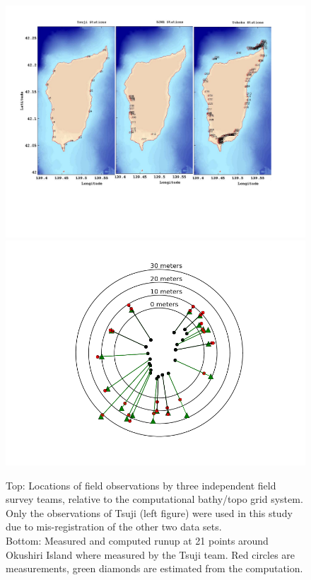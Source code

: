 \begin{figure}[ht]
\hfil\includegraphics[width=5.0in]{bp9/TeamStations.pdf}\hfil
\vskip 10pt
\hfil\includegraphics[width=5.0in]{bp9/runups.png}\hfil

\caption{\label{TeamStations}
Top: Locations of field observations by three independent field survey teams, relative to the computational bathy/topo grid system. Only the observations of Tsuji (left figure) were used in this study due to mis-registration of the other two data sets.\\
Bottom: Measured and computed runup at 21 points around Okushiri Island where measured by the Tsuji team.  Red circles are measurements, green diamonds are estimated from the computation.
  }
\end{figure}


